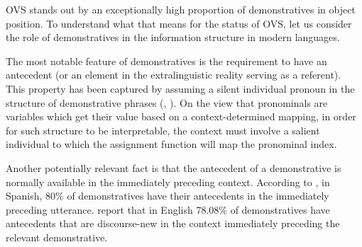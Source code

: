 \documentclass[output=paper,modfonts,nonflat]{langsci/langscibook}
\begin{document}



OVS stands out by an exceptionally high proportion of demonstratives in object position. To understand what that means for the status of OVS, let us consider the role of demonstratives in the information structure in modern languages.

The most notable feature of demonstratives is the requirement to have an antecedent (or an element in the extralinguistic reality serving as a referent). This property has been captured by assuming a silent individual pronoun in the structure of demonstrative phrases (\citealt{Nunberg:1993}, \citealt{Elbourne:2008}). On the view that pronominals are variables which get their value based on a context-determined mapping, in order for such structure to be interpretable, the context must involve a salient individual to which the assignment function will map the pronominal index.


Another potentially relevant fact is that the antecedent of a demonstrative is normally available in the immediately preceding context. According to \citet[180]{Zulaica:2011}, in Spanish, 80\% of demonstratives have their antecedents in the immediately preceding utterance. \citet[204]{StevensLight:2013} report that in English 78.08\% of demonstratives have antecedents that are discourse-new in the context immediately preceding the relevant demonstrative.
\end{document}
